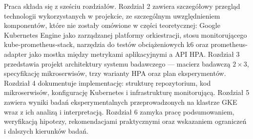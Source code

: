 Praca składa się z sześciu rozdziałów. Rozdział 2 zawiera szczegółowy przegląd technologii wykorzystanych w projekcie, ze szczególnym uwzględnieniem komponentów, które nie zostały omówione w części teoretycznej: Google Kubernetes Engine jako zarządzanej platformy orkiestracji, stosu monitorującego kube-prometheus-stack, narzędzia do testów obciążeniowych k6 oraz prometheus-adapter jako mostka między metrykami aplikacyjnymi a API HPA. Rozdział 3 przedstawia projekt architektury systemu badawczego --- macierz badawczą $2 \times 3$, specyfikację mikroserwisów, trzy warianty HPA oraz plan eksperymentów. Rozdział 4 dokumentuje implementację: strukturę repozytorium, kod mikroserwisów, konfigurację Kubernetes i infrastrukturę monitorującą. Rozdział 5 zawiera wyniki badań eksperymentalnych przeprowadzonych na klastrze GKE wraz z ich analizą i interpretacją. Rozdział 6 zamyka pracę podsumowaniem, weryfikacją hipotezy, rekomendacjami praktycznymi oraz wskazaniem ograniczeń i dalszych kierunków badań.
